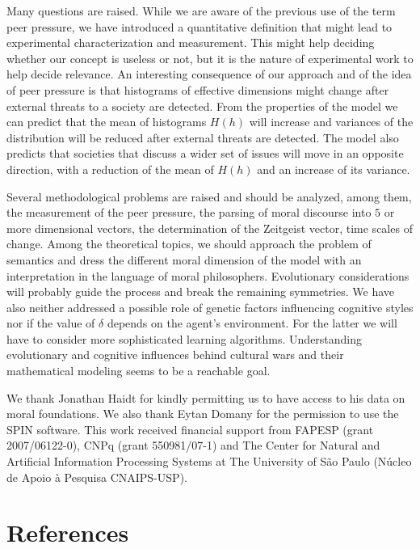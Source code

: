 \documentclass[twocolumn,showpacs]{revtex4-1}
\begin{document}
Many questions are raised. While we are aware of the previous use of 
the term peer pressure, we have introduced a quantitative definition
that might lead to experimental characterization and measurement. 
This might help deciding whether our concept is useless or not, 
but it is the nature of experimental work to help decide 
relevance. An interesting consequence 
of our approach and of the idea of peer pressure is that
histograms of effective dimensions might change after 
external threats to a society are detected. From the 
properties of the model we can  predict that the  mean of histograms
$H(h)$ will increase
and variances of the distribution will be reduced after 
external threats are detected. 
 The model also predicts that societies that discuss a wider set of 
issues will move in an opposite direction, with a reduction of the mean of
$H(h)$ and an increase
of its variance.


 Several methodological problems are raised and
should be analyzed, among them,  the measurement
of the peer pressure, the parsing of moral discourse into $5$ or more 
dimensional vectors,  the determination of the Zeitgeist vector, time scales
of change. Among the theoretical topics, we should approach the
problem of semantics and dress the different moral dimension
 of the model with  an interpretation in the language of moral philosophers.
Evolutionary considerations will probably guide the process and break
the remaining symmetries. 
 We have also neither addressed a possible role of genetic factors influencing
cognitive styles nor if the value of $\delta$ depends on the agent's 
environment. For the latter we will have to consider more 
sophisticated learning algorithms. 
Understanding evolutionary and cognitive influences behind cultural wars
and their mathematical modeling seems to be a reachable goal.



\begin{acknowledgments}
We thank Jonathan Haidt for kindly permitting us to have access to his data on moral foundations. We also thank Eytan Domany for the permission to use the SPIN software. This work received financial support from FAPESP (grant 2007/06122-0), CNPq (grant 550981/07-1) and The Center for Natural and Artificial Information Processing Systems at The University of S\~ao Paulo (N\'ucleo de Apoio \`a Pesquisa CNAIPS-USP).
\end{acknowledgments}

\section*{References}


\end{document}
